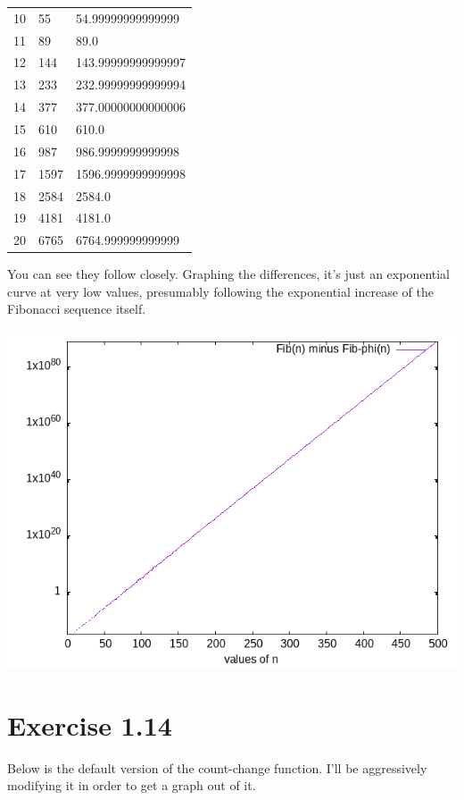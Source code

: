 \documentclass[
]{article}
\begin{document}
\begin{longtable}[]{@{}lll@{}}
\toprule
\endhead
10 & 55 & 54.99999999999999 \\
11 & 89 & 89.0 \\
12 & 144 & 143.99999999999997 \\
13 & 233 & 232.99999999999994 \\
14 & 377 & 377.00000000000006 \\
15 & 610 & 610.0 \\
16 & 987 & 986.9999999999998 \\
17 & 1597 & 1596.9999999999998 \\
18 & 2584 & 2584.0 \\
19 & 4181 & 4181.0 \\
20 & 6765 & 6764.999999999999 \\
\bottomrule
\end{longtable}

You can see they follow closely. Graphing the differences, it's just an
exponential curve at very low values, presumably following the
exponential increase of the Fibonacci sequence itself.

\includegraphics{fig/1-13.png}

\hypertarget{exercise-1.14}{%
\section{Exercise 1.14}\label{exercise-1.14}}

Below is the default version of the count-change function. I'll be
aggressively modifying it in order to get a graph out of it.
\end{document}
